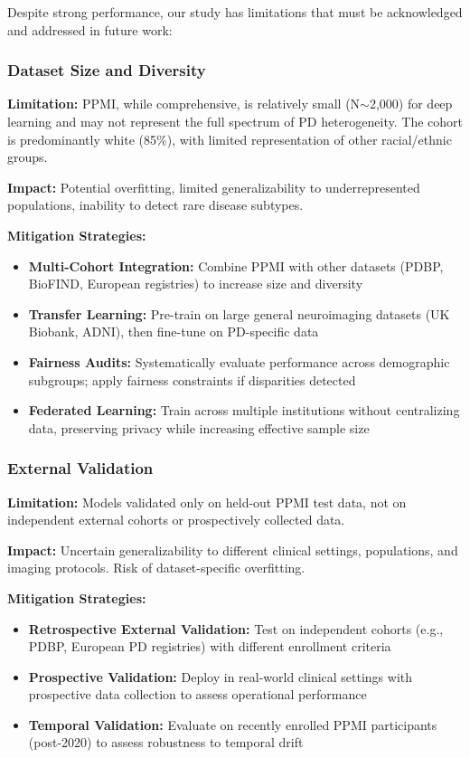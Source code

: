 \documentclass[conference]{IEEEtran}
\begin{document}
{{{Despite strong performance, our study has limitations that must be acknowledged and addressed in future work:

\subsubsection{Dataset Size and Diversity}

\textbf{Limitation:} PPMI, while comprehensive, is relatively small (N$\sim$2,000) for deep learning and may not represent the full spectrum of PD heterogeneity. The cohort is predominantly white (85\%), with limited representation of other racial/ethnic groups.

\textbf{Impact:} Potential overfitting, limited generalizability to underrepresented populations, inability to detect rare disease subtypes.

\textbf{Mitigation Strategies:}
\begin{itemize}
\item \textbf{Multi-Cohort Integration:} Combine PPMI with other datasets (PDBP, BioFIND, European registries) to increase size and diversity
\item \textbf{Transfer Learning:} Pre-train on large general neuroimaging datasets (UK Biobank, ADNI), then fine-tune on PD-specific data
\item \textbf{Fairness Audits:} Systematically evaluate performance across demographic subgroups; apply fairness constraints if disparities detected
\item \textbf{Federated Learning:} Train across multiple institutions without centralizing  data, preserving privacy while increasing effective sample size
\end{itemize}

\subsubsection{External Validation}

\textbf{Limitation:} Models validated only on held-out PPMI test data, not on independent external cohorts or prospectively collected data.

\textbf{Impact:} Uncertain generalizability to different clinical settings, populations, and imaging protocols. Risk of dataset-specific overfitting.

\textbf{Mitigation Strategies:}
\begin{itemize}
\item \textbf{Retrospective External Validation:} Test on independent cohorts (e.g., PDBP, European PD registries) with different enrollment criteria
\item \textbf{Prospective Validation:} Deploy in real-world clinical settings with prospective data collection to assess operational performance
\item \textbf{Temporal Validation:} Evaluate on recently enrolled PPMI participants (post-2020) to assess robustness to temporal drift
\end{itemize}

}}}
\end{document}
